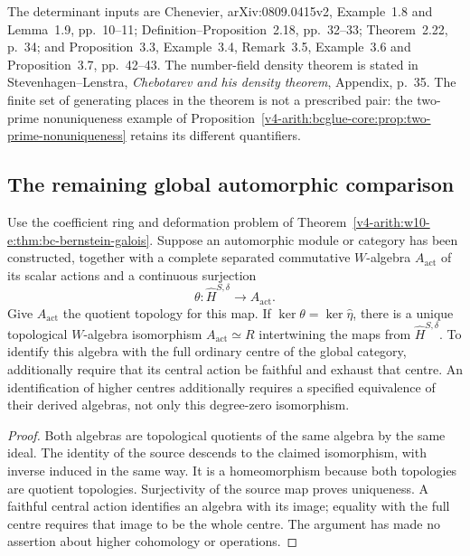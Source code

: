 The determinant inputs are Chenevier, arXiv:0809.0415v2,
Example~1.8 and Lemma~1.9, pp.~10--11; Definition--Proposition~2.18,
pp.~32--33; Theorem~2.22, p.~34; and Proposition~3.3,
Example~3.4, Remark~3.5, Example~3.6 and Proposition~3.7,
pp.~42--43. The number-field density theorem is stated in
Stevenhagen--Lenstra, \emph{Chebotarev and his density theorem},
Appendix, p.~35. The finite set of generating places in the theorem
is not a prescribed pair: the two-prime nonuniqueness example of
Proposition~\ref{v4-arith:bcglue-core:prop:two-prime-nonuniqueness}
retains its different quantifiers.

\subsection{The remaining global automorphic comparison}

\begin{proposition}
\label{v4-arith:w10-e:thm:bcglue-glue}
Use the coefficient ring and deformation problem of
Theorem~\ref{v4-arith:w10-e:thm:bc-bernstein-galois}.
Suppose an automorphic module or category has been constructed, together
with a complete separated commutative $W$-algebra $A_{\mathrm{act}}$
of its scalar actions and a continuous surjection
\[
 \theta:\widehat H^{S,\delta}\longrightarrow A_{\mathrm{act}}.
\]
Give $A_{\mathrm{act}}$ the quotient topology for this map. If
$\ker\theta=\ker\widehat\eta$, there is a unique topological
$W$-algebra isomorphism $A_{\mathrm{act}}\simeq R$ intertwining the
maps from $\widehat H^{S,\delta}$.
To identify this algebra with the full ordinary centre of the global
category, additionally require that its central action be faithful and
exhaust that centre. An identification of higher centres additionally
requires a specified equivalence of their derived algebras, not only
this degree-zero isomorphism.
\end{proposition}
\begin{proof}
Both algebras are topological quotients of the same algebra by the
same ideal. The identity of the source descends to the claimed
isomorphism, with inverse induced in the same way. It is a homeomorphism
because both topologies are quotient topologies. Surjectivity of the
source map proves uniqueness. A faithful central action identifies an
algebra with its image; equality with the full centre requires that
image to be the whole centre. The argument has made no assertion about
higher cohomology or operations.
\end{proof}

